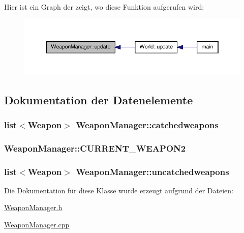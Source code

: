 Hier ist ein Graph der zeigt, wo diese Funktion aufgerufen wird\-:\nopagebreak
\begin{figure}[H]
\begin{center}
\leavevmode
\includegraphics[width=350pt]{class_weapon_manager_a59cc9e0d6cb21105cf00ac419ea2a573_icgraph}
\end{center}
\end{figure}




\subsection{Dokumentation der Datenelemente}
\hypertarget{class_weapon_manager_abf481b37e59662c0eb976cfda84dd2fe}{
\subsubsection[{catchedweapons}]{\setlength{\rightskip}{0pt plus 5cm}list$<$Weapon$>$ Weapon\-Manager\-::catchedweapons\hspace{0.3cm}{\ttfamily [private]}}}\label{class_weapon_manager_abf481b37e59662c0eb976cfda84dd2fe}
\hypertarget{class_weapon_manager_a25afeaede894545ee2f7d7f9f1ce760d}{
\subsubsection[{C\-U\-R\-R\-E\-N\-T\-\_\-\-W\-E\-A\-P\-O\-N2}]{ Weapon\-Manager\-::\-C\-U\-R\-R\-E\-N\-T\-\_\-\-W\-E\-A\-P\-O\-N2}}\label{class_weapon_manager_a25afeaede894545ee2f7d7f9f1ce760d}
\hypertarget{class_weapon_manager_ac26b9bec2027a8b153e902ec4218cd5a}{
\subsubsection[{uncatchedweapons}]{\setlength{\rightskip}{0pt plus 5cm}list$<$Weapon$>$ Weapon\-Manager\-::uncatchedweapons\hspace{0.3cm}{\ttfamily [private]}}}\label{class_weapon_manager_ac26b9bec2027a8b153e902ec4218cd5a}


Die Dokumentation für diese Klasse wurde erzeugt aufgrund der Dateien\-:\begin{DoxyCompactItemize}
\item 
\hyperlink{_weapon_manager_8h}{Weapon\-Manager.\-h}\item 
\hyperlink{_weapon_manager_8cpp}{Weapon\-Manager.\-cpp}\end{DoxyCompactItemize}
